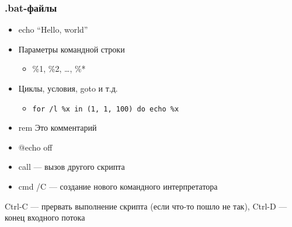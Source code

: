 \documentclass{../../slides-style}
\begin{document}
    \begin{frame}[fragile]
        \frametitle{.bat-файлы}
        \begin{itemize}
            \item echo ``Hello, world''
            \item Параметры командной строки
            \begin{itemize}
                \item  \%1, \%2, …, \%*
            \end{itemize}
            \item Циклы, условия, goto и т.д.
            \begin{itemize}
                \item 
                    \begin{footnotesize}
                        \begin{verbatim}
for /l %x in (1, 1, 100) do echo %x
                        \end{verbatim}
                    \end{footnotesize}
            \end{itemize}
            \item rem Это комментарий
            \item @echo off
            \item call --- вызов другого скрипта
            \item cmd /C --- создание нового командного интерпретатора
        \end{itemize}
        Ctrl-C --- прервать выполнение скрипта (если что-то пошло не так), Ctrl-D --- конец входного потока
    \end{frame}
\end{document}
